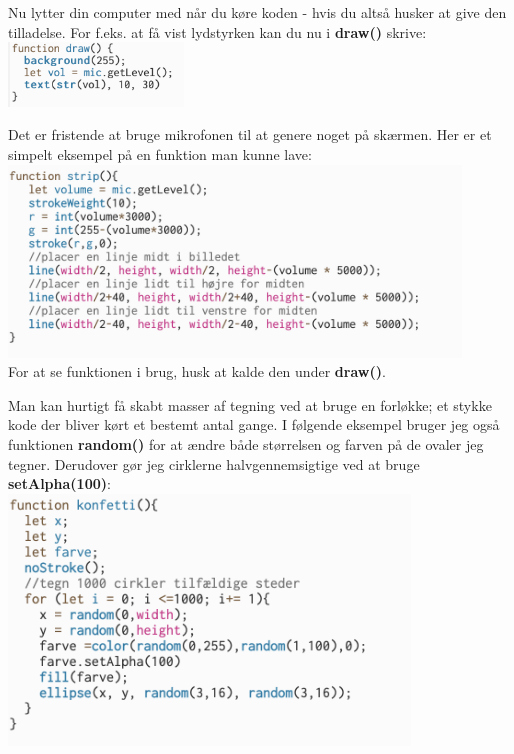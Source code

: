 \documentclass{ucph-handout}
\begin{document}
\begin{exercisebox}[adjusted title= APPENDIX]
Nu lytter din computer med når du køre koden - hvis du altså husker at give den tilladelse. For f.eks. at få vist lydstyrken kan du nu i \textbf{draw()} skrive: \\

\includegraphics[width=0.35\textwidth]{billeder/vol.png}\\

\vspace{3mm}

\end{exercisebox}


\newpage

\begin{exercisebox}[adjusted title=En funktion der tegner med lyd]

Det er fristende at bruge mikrofonen til at genere noget på skærmen. Her er et simpelt eksempel på en funktion man kunne lave: \\

\includegraphics[width=0.9\textwidth]{billeder/tegnlyd.png}\\

For at se funktionen i brug, husk at kalde den under \textbf{draw()}.

\vspace{3mm}
Man kan hurtigt få skabt masser af tegning ved at bruge en forløkke; et stykke kode der bliver kørt et bestemt antal gange. I følgende eksempel bruger jeg også funktionen \textbf{random()} for at ændre både størrelsen og farven på de ovaler jeg tegner. Derudover gør jeg cirklerne halvgennemsigtige ved at bruge \textbf{setAlpha(100)}: \\

\includegraphics[width=0.8\textwidth]{billeder/tegnforloop.png}\\


\end{exercisebox}
\end{document}
